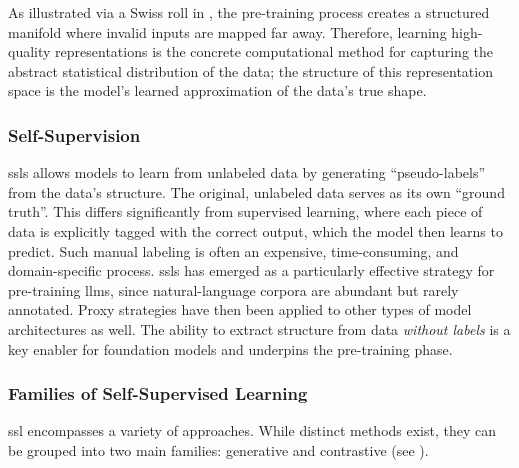 As illustrated via a Swiss roll in , the pre-training process creates a structured manifold where invalid inputs are mapped far away. Therefore, learning high-quality representations is the concrete computational method for capturing the abstract statistical distribution of the data; the structure of this representation space is the model's learned approximation of the data's true shape.

\subsubsection{Self-Supervision} \label{sec:ssl}

\glspl{ssl} allows models to learn from unlabeled data by generating \enquote{pseudo-labels} from the data's structure. 
The original, unlabeled data serves as its own \enquote{ground truth}. 
This differs significantly from supervised learning, where each piece of data is explicitly tagged with the correct output, which the model then learns to predict. 
Such manual labeling is often an expensive, time-consuming, and domain-specific process. 
\glspl{ssl} has emerged as a particularly effective strategy for pre-training \glspl{llm}, since natural-language corpora are abundant but rarely annotated. 
Proxy strategies have then been applied to other types of model architectures as well. 
The ability to extract structure from data \textit{without labels} is a key enabler for foundation models and underpins the pre-training phase.

\subsubsection{Families of Self-Supervised Learning}

\gls{ssl} encompasses a variety of approaches. While distinct methods exist, they can be grouped into two main families: generative and contrastive (see ).

